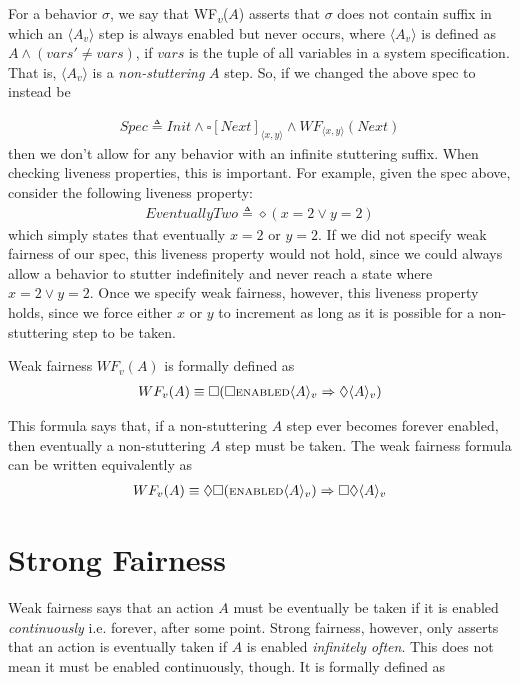 \documentclass[11pt, oneside]{article}   	%
\begin{document}
For a behavior $\sigma$, we say that WF\textsubscript{$v$}($A$) asserts that $\sigma$ does not contain suffix in which an $\langle A_v \rangle$ step is always enabled but never occurs, where $\langle A_v \rangle$ is defined as $A \wedge (vars' \neq vars)$, if $vars$ is the tuple of all variables in a system specification. That is, $\langle A_v \rangle$ is a \textit{non-stuttering} $A$ step. So, if we changed the above spec to instead be 

\begin{align*}
Spec \triangleq  Init \wedge \square[Next]_{\langle x, y \rangle} \wedge WF_{\langle x, y \rangle}(Next)
\end{align*}
then we don't allow for any behavior with an infinite stuttering suffix. When checking liveness properties, this is important. For example, given the spec above, consider the following  liveness property:
\begin{align*}
EventuallyTwo \triangleq \diamond (x=2 \vee y=2)
\end{align*}
which simply states that eventually $x=2$ or $y=2$. If we did not specify weak fairness of our spec, this liveness property would not hold, since we could always allow a behavior to stutter indefinitely and never reach a state where $x=2 \vee y=2$. Once we specify weak fairness, however, this liveness property holds, since we force either $x$ or $y$ to increment as long as it is possible for a non-stuttering step to be taken.

Weak fairness $WF_v(A)$ is formally defined as 
\begin{align*}
WF_v(A) \equiv \square (\square \text{\scriptsize ENABLED} \langle A \rangle _v \Rightarrow \Diamond \langle A \rangle _v)
\end{align*}

This formula says that, if a non-stuttering $A$ step ever becomes forever enabled, then eventually a non-stuttering $A$ step must be taken. The weak fairness formula can be written equivalently as
\begin{align*}
WF_v(A) \equiv 
\Diamond \square (\text{\scriptsize ENABLED} \langle A \rangle _v) \Rightarrow \square \Diamond \langle A \rangle _v
\end{align*}

\section*{Strong Fairness}

Weak fairness says that an action $A$ must be eventually be taken if it is enabled \textit{continuously} i.e. forever, after some point. Strong fairness, however, only asserts that an action is eventually taken if $A$ is enabled \textit{infinitely often}. This does not mean it must be enabled continuously, though. It is formally defined as
\end{document}
